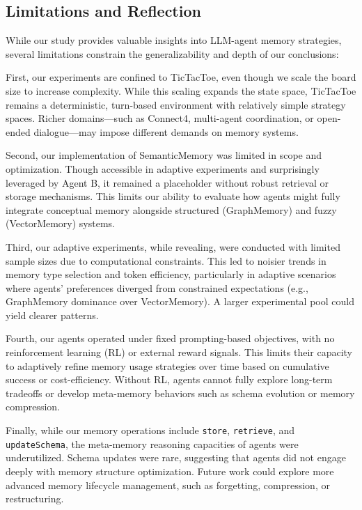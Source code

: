 \documentclass[10pt]{article}
\begin{document}
\subsection{Limitations and Reflection}

While our study provides valuable insights into LLM-agent memory strategies, several limitations constrain the generalizability and depth of our conclusions:

First, our experiments are confined to TicTacToe, even though we scale the board size to increase complexity. While this scaling expands the state space, TicTacToe remains a deterministic, turn-based environment with relatively simple strategy spaces. Richer domains—such as Connect4, multi-agent coordination, or open-ended dialogue—may impose different demands on memory systems.

Second, our implementation of SemanticMemory was limited in scope and optimization. Though accessible in adaptive experiments and surprisingly leveraged by Agent B, it remained a placeholder without robust retrieval or storage mechanisms. This limits our ability to evaluate how agents might fully integrate conceptual memory alongside structured (GraphMemory) and fuzzy (VectorMemory) systems.

Third, our adaptive experiments, while revealing, were conducted with limited sample sizes due to computational constraints. This led to noisier trends in memory type selection and token efficiency, particularly in adaptive scenarios where agents' preferences diverged from constrained expectations (e.g., GraphMemory dominance over VectorMemory). A larger experimental pool could yield clearer patterns.

Fourth, our agents operated under fixed prompting-based objectives, with no reinforcement learning (RL) or external reward signals. This limits their capacity to adaptively refine memory usage strategies over time based on cumulative success or cost-efficiency. Without RL, agents cannot fully explore long-term tradeoffs or develop meta-memory behaviors such as schema evolution or memory compression.

Finally, while our memory operations include \texttt{store}, \texttt{retrieve}, and \texttt{updateSchema}, the meta-memory reasoning capacities of agents were underutilized. Schema updates were rare, suggesting that agents did not engage deeply with memory structure optimization. Future work could explore more advanced memory lifecycle management, such as forgetting, compression, or restructuring.
\end{document}
